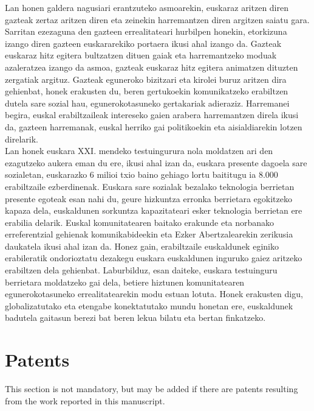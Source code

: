\documentclass[information,article,submit,moreauthors,pdftex,10pt,a4paper]{Definitions/mdpi}
\begin{document}
\indent Lan honen galdera nagusiari erantzuteko asmoarekin, euskaraz aritzen diren gazteak zertaz aritzen diren eta zeinekin harremantzen diren argitzen saiatu gara. Sarritan ezezaguna den gazteen errealitateari hurbilpen honekin, etorkizuna izango diren gazteen euskararekiko portaera ikusi ahal izango da. Gazteak euskaraz hitz egitera bultzatzen dituen gaiak eta harremantzeko moduak azaleratzea izango da asmoa, gazteak euskaraz hitz egitera animatzen dituzten zergatiak argituz. Gazteak eguneroko bizitzari eta kirolei buruz aritzen dira gehienbat, honek erakusten du, beren gertukoekin komunikatzeko erabiltzen dutela sare sozial hau, egunerokotasuneko gertakariak adieraziz. Harremanei begira, euskal erabiltzaileak intereseko gaien arabera harremantzen direla ikusi da, gazteen harremanak, euskal herriko gai politikoekin eta aisialdiarekin lotzen direlarik.\\
\indent Lan honek euskara XXI. mendeko testuingurura nola moldatzen ari den ezagutzeko aukera eman du ere, ikusi ahal izan da, euskara presente dagoela sare sozialetan, euskarazko 6 milioi txio baino gehiago lortu baititugu ia 8.000 erabiltzaile ezberdinenak. Euskara sare sozialak bezalako teknologia berrietan presente egoteak esan nahi du, geure hizkuntza erronka berrietara egokitzeko kapaza dela, euskaldunen sorkuntza kapazitateari esker teknologia berrietan ere erabilia delarik. Euskal komunitatearen baitako erakunde eta norbanako erreferentzial gehienak komunikabideekin eta Ezker Abertzalearekin zerikusia daukatela ikusi ahal izan da. Honez gain, erabiltzaile euskaldunek eginiko erabileratik ondorioztatu dezakegu euskara euskaldunen inguruko gaiez aritzeko erabiltzen dela gehienbat. Laburbilduz, esan daiteke, euskara testuinguru berrietara moldatzeko gai dela, betiere hiztunen komunitatearen egunerokotasuneko errealitatearekin modu estuan lotuta. Honek erakusten digu, globalizatutako eta etengabe konektatutako mundu honetan ere, euskaldunek badutela gaitasun berezi bat beren lekua bilatu eta bertan finkatzeko.\\ 




\section{Patents}
This section is not mandatory, but may be added if there are patents resulting from the work reported in this manuscript.

\vspace{6pt} 
\end{document}
